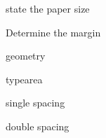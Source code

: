 \documentclass{article}
\begin{document}
\begin{compactenum}
\item state the paper size
\item Determine the margin
\begin{compactenum}
\item geometry
\item typearea
\begin{inparaenum}
\item single spacing
\item double spacing
\end{inparaenum}
\end{compactenum}
\end{compactenum}
\end{document}
